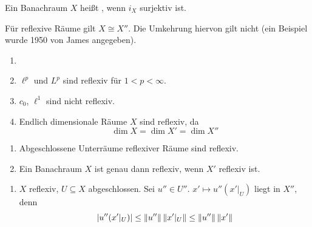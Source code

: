 \begin{definition}
	Ein Banachraum $ X $ hei\ss t , wenn $ i_X $ surjektiv ist.
\end{definition}
F\"ur reflexive R\"aume gilt $ X\cong X'' $. Die Umkehrung hiervon gilt nicht (ein Beispiel wurde 1950 von James angegeben).\\
\begin{beispiel*}
	\begin{enumerate}
		\item[]
		\item $ \ell^p $ und $ L^p $ sind reflexiv f\"ur $ 1<p<\infty $.
		\item $ c_0 $, $ \ell^1 $ sind nicht reflexiv.
		\item Endlich dimensionale R\"aume $ X $ sind reflexiv, da
		\[ \dim X=\dim X'=\dim X'' \]
	\end{enumerate}
\end{beispiel*}
\begin{satz}
	\bullshit
	\begin{enumerate}
		\item Abgeschlossene Unterr\"aume reflexiver R\"aume sind reflexiv. 
		\item Ein Banachraum $ X $ ist genau dann reflexiv, wenn $ X' $ reflexiv ist. 
	\end{enumerate}
\end{satz}
\begin{beweis}
	\begin{enumerate}
		\item $ X $ reflexiv, $ U\subseteq X $ abgeschlossen. Sei $ u''\in U'' $. $ x'\mapsto u''(x'|_U) $ liegt in $ X'' $, denn
		\[ |u''(x'|_U)|\leq\left\|u''\right\|\left\|x'|_U\right\|\leq\left\|u''\right\|\left\|x'\right\| \]
	\end{enumerate}
\end{beweis}